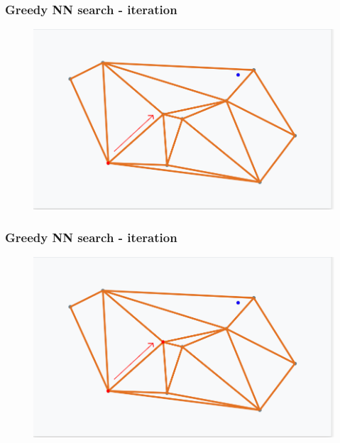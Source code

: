 \documentclass{beamer}
\begin{document}
  \begin{frame}
    \frametitle{Greedy NN search - iteration}  
  \begin{figure}[greedy_search_start_new_step_1_1]
    \vspace*{-0.1cm}
  	\includegraphics[scale=0.3]{greedy_search_start_new_step_1_1} 	
  \end{figure} 
  \end{frame}   
  

  \begin{frame}
    \frametitle{Greedy NN search - iteration}  
  \begin{figure}[greedy_search_start_new_step_1_2]
    \vspace*{-0.1cm}
  	\includegraphics[scale=0.3]{greedy_search_start_new_step_1_2} 	
  \end{figure} 
  \end{frame}     
  
\end{document}
